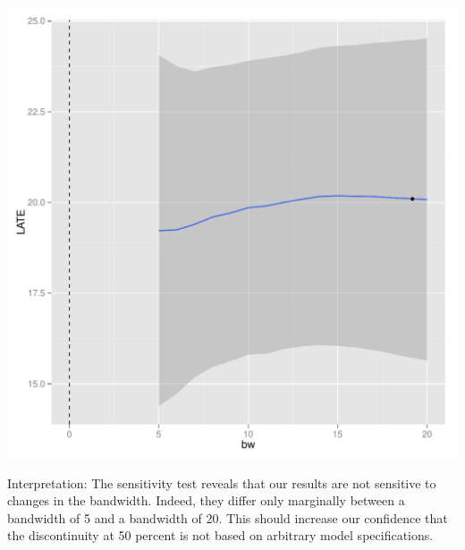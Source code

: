 \documentclass[12pt]{article}\usepackage[]{graphicx}\usepackage[]{color}
\makeatletter
\def\maxwidth{ %
  \ifdim\Gin@nat@width>\linewidth
    \linewidth
  \else
    \Gin@nat@width
  \fi
}
\newenvironment{knitrout}{}{} %
\makeatother
\begin{document}
\begin{knitrout}
\includegraphics[width=\maxwidth]{figure/unnamed-chunk-13-2} 

\end{knitrout}

Interpretation: The sensitivity test reveals that our results are not sensitive to changes in the bandwidth. Indeed, they differ only marginally between a bandwidth of 5 and a bandwidth of 20. This should increase our confidence that the discontinuity at 50 percent is not based on arbitrary model specifications.
\end{document}
